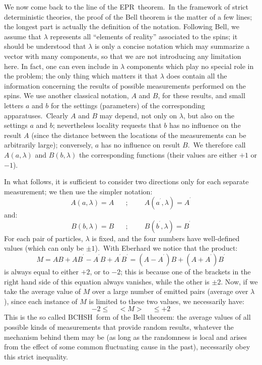 \documentclass[12pt,onecolumn]{article}%
\begin{document}
We now come back to the line of the EPR\ theorem.\ In the framework of strict
deterministic theories, the proof of the Bell theorem is the matter of a few
lines; the longest part is actually the definition of the notation. Following
Bell, we assume that $\lambda$ represents all ``elements of reality''
associated to the spins; it should be understood that $\lambda$ is only a
concise notation which may summarize a vector with many components, so that we
are not introducing any limitation here. In fact, one can even include in
$\lambda$ components which play no special role in the problem; the only thing
which matters it that $\lambda$ does contain all the information concerning
the results of possible measurements performed on the spins. We use another
classical notation, $A$ and $B$, for these results, and small letters $a$ and
$b$ for the settings (parameters) of the corresponding apparatuses.\ Clearly
$A$ and $B$ may depend, not only on $\lambda$, but also on the settings $a$
and $b$; nevertheless locality requests that $b$ has no influence on the
result $A$ (since the distance between the locations of the measurements can
be arbitrarily large); conversely, $a$ has no influence on result $B$.\ We
therefore call $A(a,\lambda)$ and $B(b,\lambda)$ the corresponding functions
(their values are either $+1$ or $-1$).

In what follows, it is sufficient to consider two directions only for each
separate measurement; we then use the simpler notation:
\begin{equation}
A(a,\lambda)=A\;\;\;\;\;\;;\;\;\;\;\;\;\;\;A(a^{^{\prime}},\lambda
)=A^{^{\prime}} \label{3}%
\end{equation}
and:
\begin{equation}
B(b,\lambda)=B\;\;\;\;\;\;;\;\;\;\;\;\;\;\;B(b^{^{\prime}},\lambda
)=B^{^{\prime}} \label{4}%
\end{equation}
For each pair of particles, $\lambda$ is fixed, and the four numbers have
well-defined values (which can only be $\pm1$).\ With Eberhard \cite{Eberhard}
we notice that the product:
\begin{equation}
M=AB+AB^{^{\prime}}-A^{^{\prime}}B+A^{^{\prime}}B^{^{\prime}}=(A-A^{^{\prime}%
})B+(A+A^{^{\prime}})B^{^{\prime}} \label{5}%
\end{equation}
is always equal to either $+2$, or to $-2$; this is because one of the
brackets in the right hand side of this equation always vanishes, while the
other is $\pm2$. Now, if we take the average value of $M$ over a large number
of emitted pairs (average over $\lambda$), since each instance of $M$ is
limited to these two values, we necessarily have:
\begin{equation}
-2\leq\,\,\,\,\,\,\,<M>\,\,\,\,\,\,\,\leq+2 \label{6}%
\end{equation}
This is the so called BCHSH\ form \cite{BCHSH} of the Bell theorem: the
average values of all possible kinds of measurements that provide random
results, whatever the mechanism behind them may be (as long as the randomness
is local and arises from the effect of some common fluctuating cause in the
past), necessarily obey this strict inequality.
\end{document}

